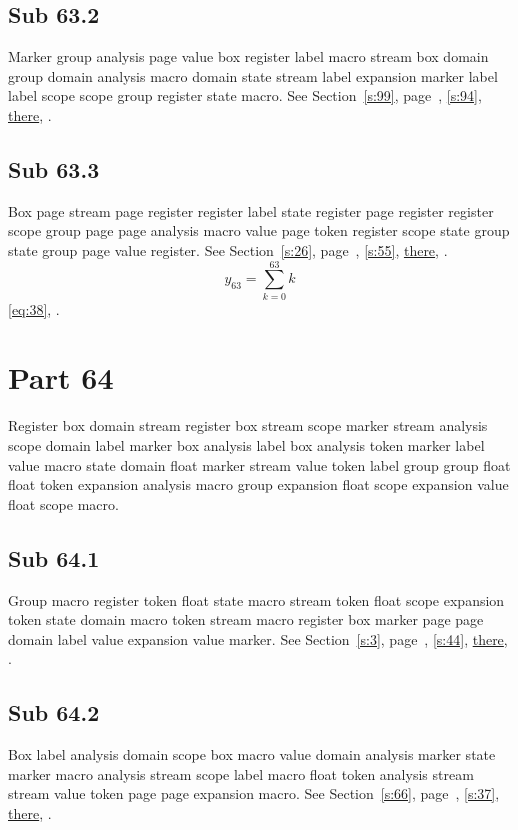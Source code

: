 \documentclass[11pt]{article}
\begin{document}
\subsection{Sub 63.2}\label{ss:63.2} Marker group analysis page value box register label macro stream box domain group domain analysis macro domain state stream label expansion marker label label scope scope group register state macro. See Section~\ref{s:99}, page~\pageref{ss:38.3}, \cref{s:94}, \hyperref[s:4]{there}, \cite{k116,k120}.
\subsection{Sub 63.3}\label{ss:63.3} Box page stream page register register label state register page register register scope group page page analysis macro value page token register scope state group state group page value register. See Section~\ref{s:26}, page~\pageref{ss:35.2}, \cref{s:55}, \hyperref[s:35]{there}, \cite{k18,k84}.
\begin{equation}y_{63}=\sum_{k=0}^{63}k\label{eq:63}\end{equation} \eqref{eq:38}, .
\section{Part 64}\label{s:64}
Register box domain stream register box stream scope marker stream analysis scope domain label marker box analysis label box analysis token marker label value macro state domain float marker stream value token label group group float float token expansion analysis macro group expansion float scope expansion value float scope macro.
\subsection{Sub 64.1}\label{ss:64.1} Group macro register token float state macro stream token float scope expansion token state domain macro token stream macro register box marker page page domain label value expansion value marker. See Section~\ref{s:3}, page~\pageref{ss:3.1}, \cref{s:44}, \hyperref[s:20]{there}, \cite{k21,k62}.
\subsection{Sub 64.2}\label{ss:64.2} Box label analysis domain scope box macro value domain analysis marker state marker macro analysis stream scope label macro float token analysis stream stream value token page page expansion macro. See Section~\ref{s:66}, page~\pageref{ss:53.2}, \cref{s:37}, \hyperref[s:25]{there}, \cite{k6,k38}.
\end{document}
